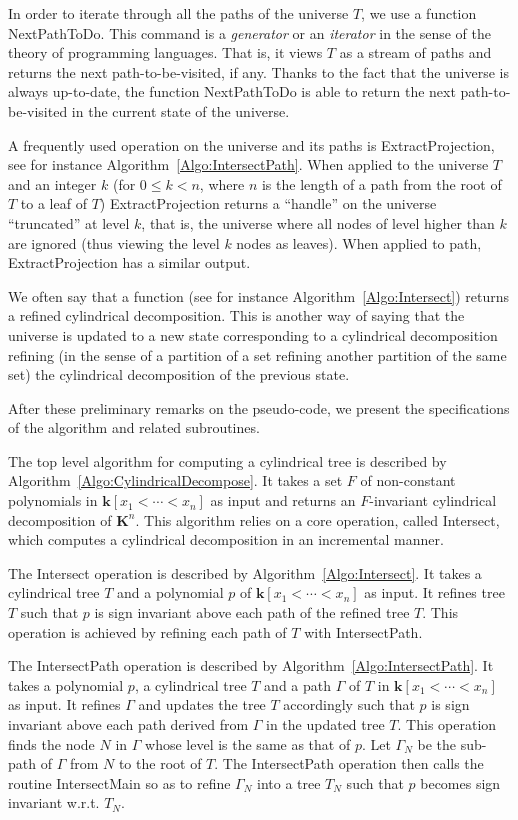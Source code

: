 \documentclass[10pt]{article}
\def\K {\ensuremath{\mathbf{k}}}
\def\KK {\ensuremath{\mathbf{K}}}
\begin{document}
In order to iterate through all the paths of the universe $T$,
we use a function {\sf NextPathToDo}.
This command is a {\em generator} or an {\em iterator}
in the sense of the theory of programming languages.
That is, it views $T$ as a stream of paths and returns
the next path-to-be-visited, if any.
Thanks to the fact that the universe is always up-to-date,
the function {\sf NextPathToDo} is able to return the next path-to-be-visited
in the current state of the universe.

A frequently used operation on the universe and its paths
is {\sf ExtractProjection}, see for instance Algorithm~\ref{Algo:IntersectPath}.
When applied to the universe $T$ and an integer $k$ (for $0 \leq k < n$,
where $n$ is the length of a path from the root of $T$ to a leaf of $T$)
{\sf ExtractProjection} returns a ``handle'' on the universe ``truncated''
at level $k$, that is, the universe where all nodes of level higher than $k$
are ignored (thus viewing the level $k$ nodes as leaves).
When applied to path, {\sf ExtractProjection} has a similar output.

We often say that a function (see for instance
Algorithm~\ref{Algo:Intersect}) returns a refined cylindrical decomposition.
This is another way of saying that the universe is updated
to a new state corresponding to a cylindrical decomposition
refining (in the sense of a partition of a set refining another 
partition of the same set) the cylindrical decomposition
of the previous state.




After these preliminary remarks on the pseudo-code,
we present the specifications of the algorithm
and related subroutines. 

The top level algorithm for computing a cylindrical tree
is described by Algorithm~\ref{Algo:CylindricalDecompose}. 
It takes a set $F$ of non-constant polynomials in $\K[x_1<\cdots<x_n]$
as input and returns an $F$-invariant cylindrical decomposition of $\KK^n$.
This algorithm relies on a core operation, 
called {\sf Intersect}, which computes a cylindrical decomposition 
in an incremental manner.

The {\sf Intersect} operation is described by Algorithm~\ref{Algo:Intersect}.
It takes a cylindrical tree $T$ and a polynomial $p$ of $\K[x_1<\cdots<x_n]$
as input. It refines tree $T$ such that $p$ is sign invariant above each path of 
the refined tree $T$.
This operation is achieved by refining each path of $T$ with {\sf IntersectPath}. 

 
The {\sf IntersectPath} operation is described by Algorithm~\ref{Algo:IntersectPath}.
It takes a polynomial $p$, a  cylindrical tree $T$ and a path $\Gamma$ of $T$ in $\K[x_1<\cdots<x_n]$
as input. It refines $\Gamma$ and updates the tree $T$ accordingly such that 
$p$ is sign invariant above each path derived from $\Gamma$ in the updated tree $T$.
This operation finds the node $N$ in $\Gamma$ whose level is the same as that of $p$.
Let ${\Gamma}_N$ be the sub-path of $\Gamma$ from $N$ to the root of $T$.
The {\sf IntersectPath} operation then 
calls the routine {\sf IntersectMain} so as to refine ${\Gamma}_N$ into a tree $T_N$
such that $p$ becomes sign invariant w.r.t. $T_N$.
\end{document}
